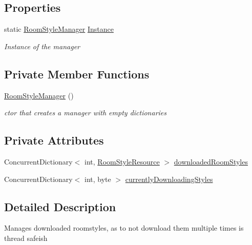 \subsection*{Properties}
\begin{DoxyCompactItemize}
\item 
static \mbox{\hyperlink{class_room_style_manager}{Room\+Style\+Manager}} \mbox{\hyperlink{class_room_style_manager_aa4bee6c020c8d25f983a975e952afd02}{Instance}}
\begin{DoxyCompactList}\small\item\em Instance of the manager \end{DoxyCompactList}\end{DoxyCompactItemize}
\subsection*{Private Member Functions}
\begin{DoxyCompactItemize}
\item 
\mbox{\hyperlink{class_room_style_manager_a47b2da6167cd42679c424266734fbeba}{Room\+Style\+Manager}} ()
\begin{DoxyCompactList}\small\item\em ctor that creates a manager with empty dictionaries \end{DoxyCompactList}\end{DoxyCompactItemize}
\subsection*{Private Attributes}
\begin{DoxyCompactItemize}
\item 
Concurrent\+Dictionary$<$ int, \mbox{\hyperlink{class_room_style_resource}{Room\+Style\+Resource}} $>$ \mbox{\hyperlink{class_room_style_manager_a03aaf980c4dccbd54255045c852d6016}{downloaded\+Room\+Styles}}
\item 
Concurrent\+Dictionary$<$ int, byte $>$ \mbox{\hyperlink{class_room_style_manager_ae508b55c7621b0c69424050942d436d6}{currently\+Downloading\+Styles}}
\end{DoxyCompactItemize}


\subsection{Detailed Description}
Manages downloaded roomstyles, as to not download them multiple times is thread safeish 



